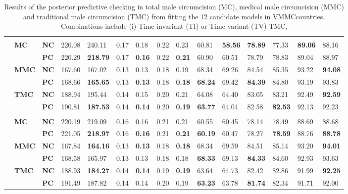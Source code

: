 \documentclass{article}
\begin{document}
\begin{landscape}
{\begin{table}[H]
\begin{tabular}{>{\bfseries}p{0.05cm} p{0.85cm} p{0.75cm} C{1.25cm} C{1.25cm} C{1.25cm} C{1.25cm} C{1.25cm} C{1.25cm} C{1.25cm} C{1.25cm} C{1.25cm} C{1.25cm} C{1.25cm} C{1.25cm}}
     \\ 
 & \bf MC & \bf NC & 220.08 & 240.11 &   0.17 &   0.18 &   0.22 &   0.23 &  60.81 & \bf 58.56 & \bf 78.89 &  77.33 & \bf 89.06 &  88.16 & \\ 
  &  & \bf PC & 220.29 & \bf218.79 &   0.17 & \bf  0.16 &   0.22 & \bf  0.21 &  60.90 &  60.51 &  78.79 &  78.83 &  89.04 &  88.97 & \\[3pt] 
  & \bf MMC & \bf NC & 167.60 & 167.02 &   0.13 &   0.13 &   0.18 &   0.19 &  68.34 &  69.26 &  84.54 &  85.35 &  93.22 & \bf 94.08 & \\ 
  &  & \bf PC & 168.66 & \bf165.65 &   0.13 & \bf  0.13 &   0.18 & \bf  0.18 & \bf 68.24 &  69.42 & \bf 84.39 &  84.80 &  93.19 &  93.83 & \\[3pt] 
  & \bf TMC & \bf NC & 188.94 & 195.44 &   0.14 &   0.15 &   0.20 &   0.21 &  64.08 &  64.40 &  83.05 &  83.21 &  92.49 & \bf 92.59 & \\ 
  &  & \bf PC & 190.81 & \bf187.53 &   0.14 & \bf  0.14 &   0.20 & \bf  0.19 & \bf 63.77 &  64.04 &  82.58 & \bf 82.53 &  92.13 &  92.23 & \\[3pt] 
     \\ 
 & \bf MC & \bf NC & 220.19 & 219.09 &   0.16 &   0.16 &   0.21 &   0.21 &  60.55 &  60.45 &  78.14 &  78.49 &  88.69 &  88.68 & \\ 
  &  & \bf PC & 221.05 & \bf218.97 &   0.16 & \bf  0.16 &   0.21 & \bf  0.21 & \bf 60.19 &  60.47 &  78.27 & \bf 78.59 &  88.76 & \bf 88.78 & \\[3pt] 
  & \bf MMC & \bf NC & 167.84 & \bf164.16 &   0.13 & \bf  0.13 &   0.18 & \bf  0.18 &  68.34 &  69.59 &  84.51 &  85.14 &  93.20 & \bf 94.01 & \\ 
  &  & \bf PC & 168.58 & 165.97 &   0.13 &   0.13 &   0.18 &   0.18 & \bf 68.33 &  69.13 & \bf 84.33 &  84.60 &  92.93 &  93.63 & \\[3pt] 
  & \bf TMC & \bf NC & 188.93 & \bf184.27 &   0.14 & \bf  0.14 &   0.19 & \bf  0.19 &  63.64 &  64.73 &  82.42 &  82.86 &  91.99 & \bf 92.25 & \\ 
  &  & \bf PC & 191.49 & 187.82 &   0.14 &   0.14 &   0.20 &   0.19 & \bf 63.23 &  63.78 & \bf 81.74 &  82.34 &  91.71 &  92.00 & \\[3pt] 
  \hline 
  \end{tabular} 
  \caption{Results of the posterior predictive checking in total male 
    circumcision (MC), medical male circumcision (MMC) and traditional male 
    circumcision (TMC) from fitting the 12 candidate models in VMMCcountries. Combinations include (i) Time invariant (TI) or Time variant (TV) TMC, 
}
\end{table}}
\end{landscape}
\end{document}
